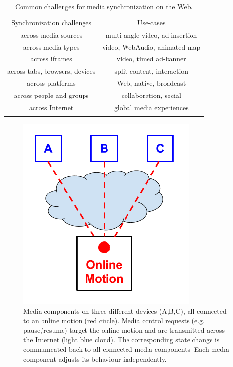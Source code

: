 \documentclass[graybox]{svmult}
\begin{document}
\begin{table}
\centering
\caption{Common challenges for media synchronization on the Web.}
\label{tab:challenges}
\setlength{\tabcolsep}{10pt}
\begin{tabular}{cc}
\hline\noalign{\smallskip}
Synchronization challenges & Use-cases \\
\noalign{\smallskip}\svhline\noalign{\smallskip}
across media sources & multi-angle video, ad-insertion \\
across media types & video, WebAudio, animated map \\
across iframes & video, timed ad-banner \\
across tabs, browsers, devices & split content, interaction \\
across platforms & Web, native, broadcast \\
across people and groups & collaboration, social \\
across Internet & global media experiences \\
\noalign{\smallskip}\hline\noalign{\smallskip}
\end{tabular}
\end{table} 


\begin{figure}[h]
\centering
\includegraphics[scale=.4]{fig/motion-model.png}
\caption{Media components on three different devices (A,B,C), all connected to an online motion
(red circle). Media control requests (e.g. pause/resume) target the online motion and are transmitted across the Internet (light blue cloud). The corresponding state change is
communicated back to all connected media components. Each media component
adjusts its behaviour independently.}
\label{fig:model}
\end{figure}
\end{document}
